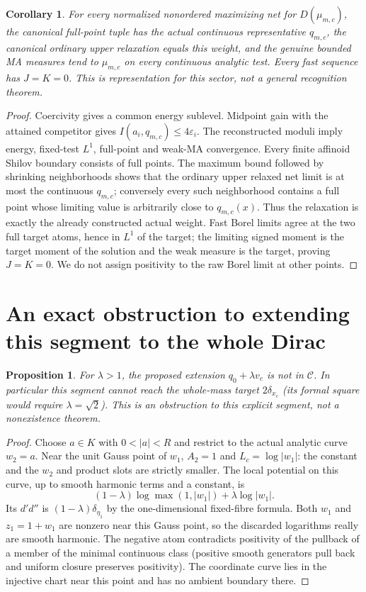 \documentclass[11pt]{article}
\newtheorem{proposition}[theorem]{Proposition}
\newtheorem{corollary}[theorem]{Corollary}
\newcommand{\DD}{d'd''}
\newcommand{\C}{\mathcal C}
\begin{document}
\begin{corollary}\label{newns:nonordered}
For every normalized nonordered maximizing net for $D(\mu_{m,c})$,
the canonical full-point tuple has the actual continuous representative
$q_{m,c}$, the canonical ordinary upper relaxation equals this weight,
and the genuine bounded MA measures tend to $\mu_{m,c}$ on every
continuous analytic test. Every fast sequence has $J=K=0$.
This is representation for this sector, not a general recognition theorem.
\end{corollary}
\begin{proof}
Coercivity gives a common energy sublevel. Midpoint gain with the
attained competitor gives $I(a_i,q_{m,c})\le4\varepsilon_i$.
The reconstructed moduli imply energy, fixed-test $L^1$, full-point
and weak-MA convergence. Every finite affinoid Shilov boundary consists
of full points. The maximum bound followed by shrinking neighborhoods
shows that the ordinary upper relaxed net limit is at most the continuous
$q_{m,c}$; conversely every such neighborhood contains a full point
whose limiting value is arbitrarily close to $q_{m,c}(x)$.
Thus the relaxation is exactly the already constructed actual weight.
Fast Borel limits agree at the two full target atoms, hence in $L^1$
of the target; the limiting signed moment is the target moment of the
solution and the weak measure is the target, proving $J=K=0$.
We do not assign positivity to the raw Borel limit at other points.
\end{proof}

\section{An exact obstruction to extending this segment to the whole Dirac}
\begin{proposition}\label{newns:obstruction}
For $\lambda>1$, the proposed extension $q_0+\lambda v_c$ is not
in $\C$. In particular this segment cannot reach the whole-mass target
$2\delta_{x_c}$ (its formal square would require $\lambda=\sqrt2$).
This is an obstruction to this explicit segment, not a nonexistence theorem.
\end{proposition}
\begin{proof}
Choose $a\in K$ with $0<|a|<R$ and restrict to the actual analytic
curve $w_2=a$. Near the unit Gauss point of $w_1$, $A_2=1$ and
$L_c=\log|w_1|$: the constant and the $w_2$ and product slots are
strictly smaller. The local potential on this curve, up to smooth
harmonic terms and a constant, is
\[
 (1-\lambda)\log\max(1,|w_1|)+\lambda\log|w_1|.
\]
Its $\DD$ is $(1-\lambda)\delta_{\eta_1}$ by the one-dimensional
fixed-fibre formula. Both $w_1$ and $z_1=1+w_1$ are nonzero near
this Gauss point, so the discarded logarithms really are smooth harmonic.
The negative atom contradicts positivity of the pullback of a member of
the minimal continuous class (positive smooth generators pull back and
uniform closure preserves positivity). The coordinate curve lies in the
injective chart near this point and has no ambient boundary there.
\end{proof}
\end{document}
